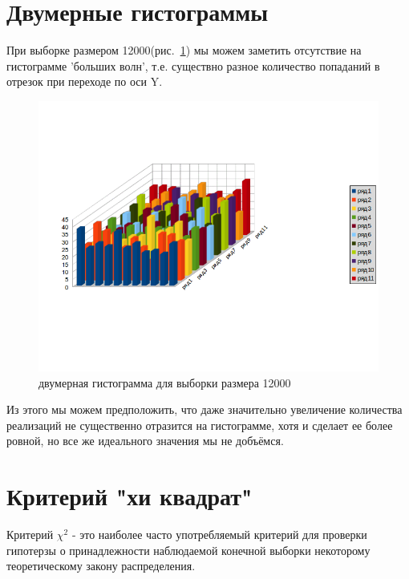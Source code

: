 \documentclass[a4paper,12pt]{article}
\begin{document}
\newpage\section{Двумерные гистограммы} 

При выборке размером 12000(рис.~\ref{fig:im3D_1}) мы можем заметить отсутствие на гистограмме 'больших волн', т.е. существно разное количество попаданий в отрезок при переходе по оси Y.
\begin{center}
	\begin{figure}[h]
	    \centering
   		\includegraphics[scale=0.4]{figure_1_1.png}
   		\caption{двумерная гистограмма для выборки размера 12000}
   		\label{fig:im3D_1}
    \end{figure}
\end{center}

Из этого мы можем предположить, что даже значительно увеличение количества реализаций не существенно отразится на гистограмме, хотя и сделает ее более ровной, но все же идеального значения мы не добъёмся.

\newpage\section{Критерий "хи квадрат"}
 
\captionsetup{justification = raggedright}

Критерий $\chi^2$ - это наиболее часто употребляемый критерий для проверки гипотерзы о принадлежности наблюдаемой конечной выборки некоторому теоретическому закону распределения.
\end{document}
